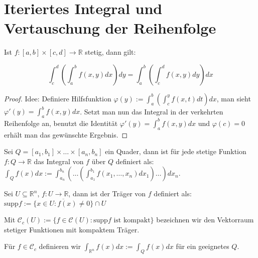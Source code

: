\section{Iteriertes Integral und Vertauschung der Reihenfolge}
\begin{lemma}
	Ist $f:[a,b]\times[c,d]\rightarrow \mathbb R$ stetig, dann gilt:
	
	$$\int_c^d \left(\int_a^b f(x,y) dx \right)dy = \int_a^b \left(\int_c^d f(x,y) dy \right)dx$$
\end{lemma}
\begin{proof}
	Idee: Definiere Hilfsfunktion $\varphi(y):=\int_a^b\left(\int_c^y f(x,t)dt \right)dx$, man sieht $\varphi'(y)=\int_a^b f(x,y)dx$. Setzt man nun das Integral in der verkehrten Reihenfolge an, benutzt die Identit\"at $\varphi'(y)=\int_a^b f(x,y)dx$ und $\varphi(c)=0$ erh\"alt man das gew\"unschte Ergebnis.
\end{proof}
\begin{definition}
	Sei $Q = [a_1,b_1]\times\dots\times[a_n,b_n]$ ein Quader, dann ist f\"ur jede stetige Funktion $f:Q\rightarrow \mathbb R$ das Integral von $f$ \"uber $Q$ definiert als: $\int_Q f(x)dx := \int_{a_n}^{b_n} \left(\dots\left(\int_{a_1}^{b_1}f(x_1,\dots,x_n)dx_1\right)\dots\right)dx_n$.
\end{definition}
\begin{definition}
	Sei $U\subseteq \mathbb R^n$, $f:U\rightarrow\mathbb R$, dann ist der Tr\"ager von $f$ definiert als: $\text{supp}f:=\overline{\{x\in U: f(x)\neq 0\}}\cap U$
\end{definition}
\begin{definition}
	Mit $\mathcal C_c(U):=\{f\in \mathcal C(U) : \text{supp}f \text{ ist kompakt}\}$ bezeichnen wir den Vektorraum stetiger Funktionen mit kompaktem Tr\"ager.
\end{definition}
\begin{definition}
	F\"ur $f\in\mathcal C_c$ definieren wir $\int_{\mathbb R^n} f(x)dx := \int_Q f(x)dx$ f\"ur ein geeignetes $Q$.
\end{definition}



